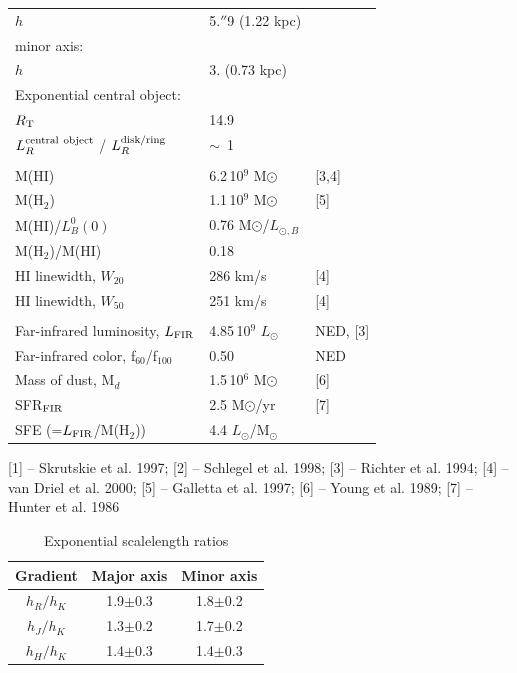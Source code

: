 \documentclass{aa}
\begin{document}
\begin{table}
\begin{tabular}{lll}
$h$               & 5.$''$9 (1.22 kpc)  &     \\
minor axis:                    &        &     \\
$h$                            &  3.\arcsec5 (0.73 kpc)  &   \\
Exponential central object:    &                &      \\
$R_{\rm T}$                    &  14.9          &      \\
$L_R^{\rm central ~object}$ / $L_R^{\rm disk/ring}$  &  $\sim$~1   &  \\ 
                               &                     &        \\
M(HI)& 6.2\,10$^9$ M$\odot$ & [3,4] \\
M(H$_2$)& 1.1\,10$^9$ M$\odot$ & [5] \\
M(HI)/$L_B^0(0)$               & 0.76 M$\odot$/$L_{\odot,B}$   &   \\
M(H$_2$)/M(HI)                 & 0.18                 &      \\
HI linewidth, $W_{20}$         & 286 km/s  & [4] \\
HI linewidth, $W_{50}$         & 251 km/s  & [4] \\
                               &                      &     \\
Far-infrared luminosity, $L_{\rm FIR}$ & 4.85\,10$^9$ $L_{\odot}$ & NED, [3] \\
Far-infrared color, f$_{60}$/f$_{100}$ & 0.50   & NED \\
Mass of dust, M$_d$            & 1.5\,10$^6$ M$\odot$ & [6]  \\
SFR$_{\rm FIR}$                & 2.5 M$\odot$/yr  & [7]  \\
SFE (=$L_{\rm FIR}$/M(H$_2$))  & 4.4 $L_{\odot}$/M$_{\odot}$ \\
\hline 
\end{tabular} 
[1] -- Skrutskie et al. 1997;
[2] -- Schlegel et al. 1998; [3] -- Richter et al. 1994; 
[4] -- van Driel et al. 2000; [5] -- Galletta et al. 1997;
[6] -- Young et al. 1989; [7] -- Hunter et al. 1986
\end{table}


\begin{table}
\caption{Exponential  scalelength ratios}
\begin{center}
\begin{tabular}{|c|c|c|}
\hline
Gradient & Major axis  & Minor axis \\
\hline
$h_R/h_K$& 1.9$\pm$0.3 & 1.8$\pm$0.2 \\
$h_J/h_K$& 1.3$\pm$0.2 & 1.7$\pm$0.2 \\
$h_H/h_K$& 1.4$\pm$0.3 & 1.4$\pm$0.3 \\
\hline
\end{tabular}
\end{center}
\end{table}
\end{document}
